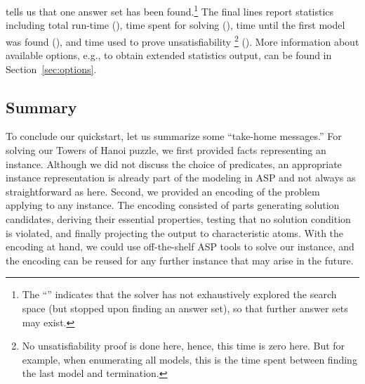 tells us that one answer set has been found.\footnote{%
The ``\code{+}'' indicates that 
the solver has not exhaustively explored the search space
(but stopped upon finding an answer set),
so that further answer sets may exist.}
The final lines report statistics including
total run-time (),
time spent for solving (),
time until the first model was found (), and
time used to prove unsatisfiability%
\footnote{
No unsatisfiability proof is done here, hence, this time is zero here.
But for example, when enumerating all models, this is the time spent between finding the last model and termination.
} ().
More information about available options, e.g.,
to obtain extended statistics output,
can be found in Section~\ref{sec:options}.

\subsection{Summary}

To conclude our quickstart, let us summarize some ``take-home messages.''
For solving our Towers of Hanoi puzzle, we first provided facts representing an instance.
Although we did not discuss the choice of predicates, an
appropriate instance representation is already part of the modeling in ASP and
not always as straightforward as here.
Second, we provided an encoding of the problem applying to any instance.
The encoding consisted of parts generating solution candidates,
deriving their essential properties,
testing that no solution condition is violated,
and finally projecting the output to characteristic atoms.
With the encoding at hand, we could use off-the-shelf ASP tools to solve our instance,
and the encoding can be reused for any further
instance that may arise in the future.

